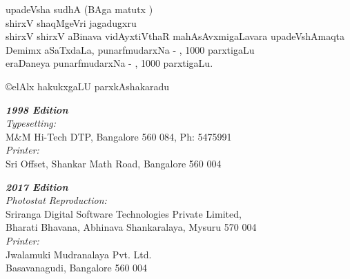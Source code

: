 \begin{center}
upadeVsha sudhA (BAga {} matutx {})\\
shirxV shaqMgeVri jagadugxru\\
shirxV shirxV aBinava vidAyxtiVthaR mahAsAvxmigaLavara upadeVshAmaqta\\
Demimx aSaTxdaLa, punarfmudarxNa - {, 1000}  parxtigaLu\\ 
eraDaneya punarfmudarxNa - {, 1000}  parxtigaLu. 
\end{center}
\vfill

\noindent
{\eng\copyright}elAlx hakukxgaLU parxkAshakaradu
\vfill

\noindent
\bgroup
{\sl\eng\bfseries 1998 Edition}\\
{\sl\eng Typesetting:}\\
{\eng M\&M Hi-Tech DTP, Bangalore 560 084, Ph: 5475991}\\
{\sl\eng Printer:}\\
{\eng Sri Offset, Shankar Math Road, Bangalore 560 004}
\bigskip

\noindent
{\sl\eng\bfseries 2017 Edition}\\
{\sl\eng Photostat Reproduction:}\\
{\eng Sriranga Digital Software Technologies Private Limited,\\ 
Bharati Bhavana, Abhinava Shankaralaya, Mysuru 570 004}\\
{\sl\eng Printer:}\\
{\eng Jwalamuki Mudranalaya Pvt. Ltd.\\
Basavanagudi, Bangalore 560 004}
